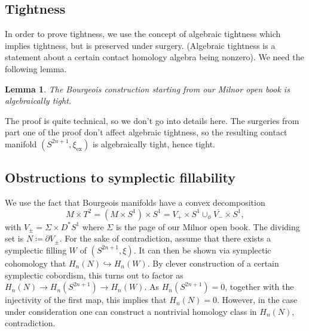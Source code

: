 \documentclass{amsart}
\newtheorem{lemma}{Lemma}
\newtheorem{definition}{Definition}
\begin{document}
\subsection*{Tightness}

In order to prove tightness, we use the concept of algebraic tightness which implies tightness,
but is preserved under surgery.
(Algebraic tightness is a statement about a certain contact homology algebra being nonzero).
We need the following lemma.
\begin{lemma}
    The Bourgeois construction starting from our Milnor open book
    is algebraically tight.
\end{lemma}
The proof is quite technical, so we don't go into details here.
The surgeries from part one of the proof don't affect algebraic tightness, so the resulting
contact manifold $(S^{2n+1}, \xi_\mathrm{ex})$ is algebraically tight, hence tight.


\subsection*{Obstructions to symplectic fillability}
We use the fact that Bourgeois manifolds have a convex decomposition
\[
    M \times T^2 = (M \times S^1) \times S^1 = V_+ \times S^1 \cup_\phi \overline{V_-} \times S^1,  
\]
with $V_{\pm} = \Sigma \times D^*S^1$ where $\Sigma$ is the page of our Milnor open book.
The dividing set is $N \coloneqq \partial V_{\pm}$.
For the sake of contradiction, assume that there exists a symplectic filling $W$ of $(S^{2n+1}, \xi)$.
It can then be shown via symplectic cohomology that $H_n(N) \hookrightarrow H_n(W)$.
By clever construction of a certain symplectic cobordism, this turns out to factor
as $H_n(N) \to H_n(S^{2n+1}) \to H_n(W)$.
As $H_n(S^{2n+1}) = 0$, together with the injectivity of the first map,
this implies that $H_n(N) = 0$.
However, in the case under consideration one can construct a nontrivial homology class
in $H_n(N)$, contradiction.



\end{document}
